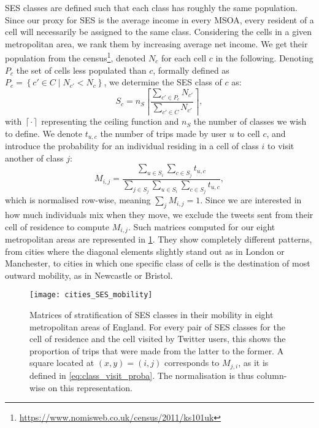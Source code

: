 \documentclass[../thesis.tex]{subfiles}
\begin{document}
\Ac{SES} classes are defined such that each class has roughly the same population. Since
our proxy for \ac{SES} is the average income in every \ac{MSOA}, every resident of a
cell will necessarily be assigned to the same class. Considering the cells in a given
metropolitan area, we rank them by increasing average net income. We get their
population from the
census\footnote{\url{https://www.nomisweb.co.uk/census/2011/ks101uk}}, denoted $N_c$ for
each cell $c$ in the following. Denoting $P_c$ the set of cells less populated than $c$,
formally defined as $P_c = \left\{ c' \in C \mid N_{c'} < N_c \right\}$, we determine the
\ac{SES} class of $c$ as:
\begin{equation}
  S_c = n_S \left\lceil \frac{\sum_{c' \in P_c} N_{c'}}{\sum_{c' \in C} N_{c'}} \right\rceil,
\end{equation}
with $\left\lceil \cdot \right\rceil$ representing the ceiling function and $n_S$ the
number of classes we wish to define. We denote $t_{u, c}$ the number of trips made by
user $u$ to cell $c$, and introduce the probability for an individual residing in a cell
of class $i$ to visit another of class $j$:
\begin{equation}
  \label{eq:class_visit_proba}
  M_{i, j} = \frac{
      \sum_{u \in S_i} \sum_{c \in S_j} t_{u, c}
    }{
      \sum_{j \in S_j} \sum_{u \in S_i} \sum_{c \in S_j} t_{u, c}
    },
\end{equation}
which is normalised row-wise, meaning $\sum_j M_{i, j} = 1$. Since we are interested in
how much individuals mix when they move, we exclude the tweets sent from their cell of
residence to compute $M_{i, j}$. Such matrices computed for our eight metropolitan areas
are represented in \cref{fig:cities_SES_mobility}. They show completely different
patterns, from cities where the diagonal elements slightly stand out as in London or
Manchester, to cities in which one specific class of cells is the destination of most
outward mobility, as in Newcastle or Bristol.
\begin{figure}
\centering
  \texttt{[image: cities\_SES\_mobility]}
  \caption{ Matrices of stratification of \ac{SES} classes in their mobility in eight
  metropolitan areas of England. For every pair of \ac{SES} classes for the cell of
  residence and the cell visited by Twitter users, this shows the proportion of trips
  that were made from the latter to the former. A square located at $(x, y) = (i, j)$
  corresponds to $M_{j, i}$, as it is defined in \cref{eq:class_visit_proba}. The
  normalisation is thus column-wise on this representation.}
  \label{fig:cities_SES_mobility}
\end{figure}
\end{document}
